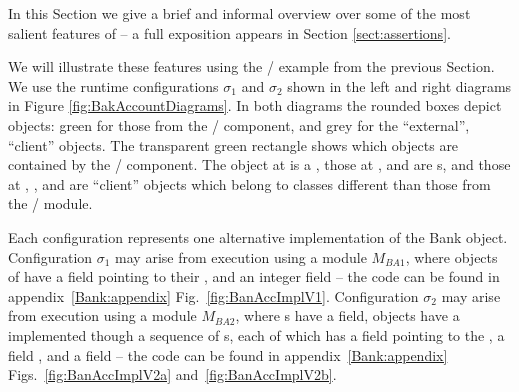 %
In this Section we  give a brief and informal  overview over some of the most salient features of  
\Chainmail -- a full exposition appears in Section \ref{sect:assertions}.



 We  will illustrate these features using the  / example from the previous Section.
We   use the runtime configurations $\sigma_1$ and $\sigma_2$ 
shown in the left and right diagrams in Figure \ref{fig:BakAccountDiagrams}.
In both diagrams the rounded boxes depict objects:  green for those from the 
/ component, and grey for the ``external'',  ``client'' objects.
The transparent green rectangle  shows which objects are contained by the / component.
The object at  is a , those at ,  and  are 
s, and those at , ,  and  are 
``client'' objects which belong to classes different than those from the /  module.

Each configuration represents one alternative implementation of the Bank object.
Configuration  $\sigma_1$ may arise from execution using a module $M_{BA1}$, where   objects of
  have a field  pointing to their , and an integer field  
-- the code can be found in appendix~\ref{Bank:appendix} Fig.~\ref{fig:BanAccImplV1}.
Configuration  $\sigma_2$ may arise from execution using a module $M_{BA2}$,  where s have a 
field,   objects  have a  implemented though a sequence of s, each of which has a
 field pointing to the , a field , and a
 field  -- the code can be found in appendix~\ref{Bank:appendix}
Figs.~\ref{fig:BanAccImplV2a} and~\ref{fig:BanAccImplV2b}.

